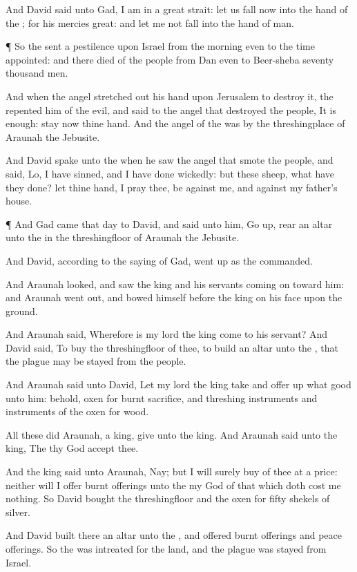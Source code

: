 {And
David
said unto
Gad, I am in a
great
strait: let us
fall now into the
hand of the
{}; for his
mercies
{}
great: and let me not
fall into the
hand of
man.


\par }{\PP {}¶ So the
{}
sent a
pestilence upon
Israel from the
morning even to the
time
appointed: and there
died of the
people from
Dan even to
Beer-sheba
seventy
thousand
men.

And when the
angel stretched
out his
hand upon
Jerusalem to
destroy it, the
{}
repented him of the
evil, and
said to the
angel that
destroyed the
people, It is
enough:
stay now thine
hand. And the
angel of the
{} was by the
threshingplace of
Araunah the
Jebusite.

And
David
spake unto the
{} when he
saw the
angel that
smote the
people, and
said, Lo, I have
sinned, and I have done
wickedly: but these
sheep, what have they
done? let thine
hand, I pray thee, be against me, and against my
father’s
house.


\par }{\PP {}¶ And
Gad
came that
day to
David, and
said unto him, Go
up,
rear an
altar unto the
{} in the
threshingfloor of
Araunah the
Jebusite.

And
David, according to the
saying of
Gad, went
up as the
{}
commanded.

And
Araunah
looked, and
saw the
king and his
servants coming
on toward him: and
Araunah went
out, and
bowed himself before the
king on his
face upon the
ground.

And
Araunah
said, Wherefore is my
lord the
king
come to his
servant? And
David
said, To
buy the
threshingfloor of thee, to
build an
altar unto the
{}, that the
plague may be
stayed from the
people.

And
Araunah
said unto
David, Let my
lord the
king
take and offer
up what
{}
good unto
him:
behold,
{}
oxen for burnt
sacrifice, and threshing
instruments and
{}
instruments of the
oxen for
wood.

All these
{} did
Araunah,
{} a
king,
give unto the
king. And
Araunah
said unto the
king, The
{} thy
God
accept thee.

And the
king
said unto
Araunah, Nay; but I will
surely
buy
{} of thee at a
price: neither will I
offer burnt
offerings unto the
{} my
God of that which doth cost me
nothing. So
David
bought the
threshingfloor and the
oxen for
fifty
shekels of
silver.

And
David
built there an
altar unto the
{}, and
offered burnt
offerings and peace
offerings. So the
{} was
intreated for the
land, and the
plague was
stayed from
Israel.


\par }
